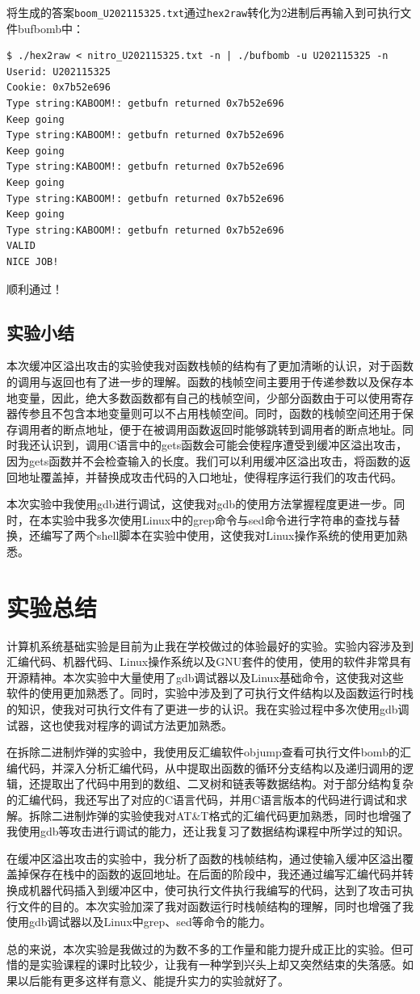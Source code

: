 \documentclass{paper}
\begin{document}
\begin{enumerate}
将生成的答案\verb|boom_U202115325.txt|通过\verb|hex2raw|转化为2进制后再输入到可执行文件bufbomb中：
\begin{lstlisting}
$ ./hex2raw < nitro_U202115325.txt -n | ./bufbomb -u U202115325 -n
Userid: U202115325
Cookie: 0x7b52e696
Type string:KABOOM!: getbufn returned 0x7b52e696
Keep going
Type string:KABOOM!: getbufn returned 0x7b52e696
Keep going
Type string:KABOOM!: getbufn returned 0x7b52e696
Keep going
Type string:KABOOM!: getbufn returned 0x7b52e696
Keep going
Type string:KABOOM!: getbufn returned 0x7b52e696
VALID
NICE JOB!
\end{lstlisting}
顺利通过！

\end{enumerate}

\subsection{实验小结}

本次缓冲区溢出攻击的实验使我对函数栈帧的结构有了更加清晰的认识，对于函数的调用与返回也有了进一步的理解。函数的栈帧空间主要用于传递参数以及保存本地变量，因此，绝大多数函数都有自己的栈帧空间，少部分函数由于可以使用寄存器传参且不包含本地变量则可以不占用栈帧空间。同时，函数的栈帧空间还用于保存调用者的断点地址，便于在被调用函数返回时能够跳转到调用者的断点地址。同时我还认识到，调用C语言中的gets函数会可能会使程序遭受到缓冲区溢出攻击，因为gets函数并不会检查输入的长度。我们可以利用缓冲区溢出攻击，将函数的返回地址覆盖掉，并替换成攻击代码的入口地址，使得程序运行我们的攻击代码。

本次实验中我使用gdb进行调试，这使我对gdb的使用方法掌握程度更进一步。同时，在本实验中我多次使用Linux中的grep命令与sed命令进行字符串的查找与替换，还编写了两个shell脚本在实验中使用，这使我对Linux操作系统的使用更加熟悉。

\section{实验总结}

计算机系统基础实验是目前为止我在学校做过的体验最好的实验。实验内容涉及到汇编代码、机器代码、Linux操作系统以及GNU套件的使用，使用的软件非常具有开源精神。本次实验中大量使用了gdb调试器以及Linux基础命令，这使我对这些软件的使用更加熟悉了。同时，实验中涉及到了可执行文件结构以及函数运行时栈的知识，使我对可执行文件有了更进一步的认识。我在实验过程中多次使用gdb调试器，这也使我对程序的调试方法更加熟悉。

在拆除二进制炸弹的实验中，我使用反汇编软件objump查看可执行文件bomb的汇编代码，并深入分析汇编代码，从中提取出函数的循环分支结构以及递归调用的逻辑，还提取出了代码中用到的数组、二叉树和链表等数据结构。对于部分结构复杂的汇编代码，我还写出了对应的C语言代码，并用C语言版本的代码进行调试和求解。拆除二进制炸弹的实验使我对AT\&T格式的汇编代码更加熟悉，同时也增强了我使用gdb等攻击进行调试的能力，还让我复习了数据结构课程中所学过的知识。

在缓冲区溢出攻击的实验中，我分析了函数的栈帧结构，通过使输入缓冲区溢出覆盖掉保存在栈中的函数的返回地址。在后面的阶段中，我还通过编写汇编代码并转换成机器代码插入到缓冲区中，使可执行文件执行我编写的代码，达到了攻击可执行文件的目的。本次实验加深了我对函数运行时栈帧结构的理解，同时也增强了我使用gdb调试器以及Linux中grep、sed等命令的能力。

总的来说，本次实验是我做过的为数不多的工作量和能力提升成正比的实验。但可惜的是实验课程的课时比较少，让我有一种学到兴头上却又突然结束的失落感。如果以后能有更多这样有意义、能提升实力的实验就好了。
\end{document}

